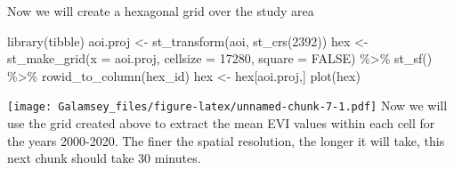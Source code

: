 \documentclass[
]{report}
\newenvironment{Shaded}{\begin{snugshade}}{\end{snugshade}}
\newcommand{\AttributeTok}[1]{\textcolor[rgb]{0.77,0.63,0.00}{#1}}
\newcommand{\ConstantTok}[1]{\textcolor[rgb]{0.00,0.00,0.00}{#1}}
\newcommand{\DecValTok}[1]{\textcolor[rgb]{0.00,0.00,0.81}{#1}}
\newcommand{\FunctionTok}[1]{\textcolor[rgb]{0.00,0.00,0.00}{#1}}
\newcommand{\NormalTok}[1]{#1}
\newcommand{\OtherTok}[1]{\textcolor[rgb]{0.56,0.35,0.01}{#1}}
\newcommand{\SpecialCharTok}[1]{\textcolor[rgb]{0.00,0.00,0.00}{#1}}
\newcommand{\StringTok}[1]{\textcolor[rgb]{0.31,0.60,0.02}{#1}}
\begin{document}
Now we will create a hexagonal grid over the study area

\begin{Shaded}
\begin{Highlighting}[]
\FunctionTok{library}\NormalTok{(tibble)}
\NormalTok{aoi.proj }\OtherTok{\textless{}{-}} \FunctionTok{st\_transform}\NormalTok{(aoi, }\FunctionTok{st\_crs}\NormalTok{(}\DecValTok{2392}\NormalTok{))}
\NormalTok{hex }\OtherTok{\textless{}{-}} \FunctionTok{st\_make\_grid}\NormalTok{(}\AttributeTok{x =}\NormalTok{ aoi.proj, }\AttributeTok{cellsize =} \DecValTok{17280}\NormalTok{, }\AttributeTok{square =} \ConstantTok{FALSE}\NormalTok{) }\SpecialCharTok{\%\textgreater{}\%}
\FunctionTok{st\_sf}\NormalTok{() }\SpecialCharTok{\%\textgreater{}\%}
\FunctionTok{rowid\_to\_column}\NormalTok{(}\StringTok{\textquotesingle{}hex\_id\textquotesingle{}}\NormalTok{)}
\NormalTok{hex }\OtherTok{\textless{}{-}}\NormalTok{ hex[aoi.proj,]}
\FunctionTok{plot}\NormalTok{(hex)}
\end{Highlighting}
\end{Shaded}

\texttt{[image: Galamsey\_files/figure-latex/unnamed-chunk-7-1.pdf]} Now
we will use the grid created above to extract the mean EVI values within
each cell for the years 2000-2020. The finer the spatial resolution, the
longer it will take, this next chunk should take 30 minutes.
\end{document}
